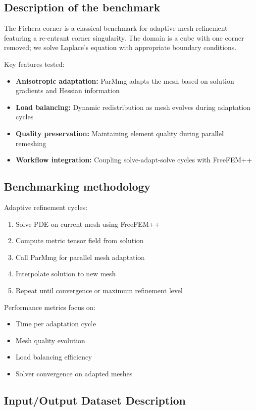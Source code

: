 \subsection{Description of the benchmark}

The Fichera corner is a classical benchmark for adaptive mesh refinement featuring a re‑entrant corner singularity. The domain is a cube with one corner removed; we solve Laplace's equation with appropriate boundary conditions.

Key features tested:
\begin{itemize}
\item \textbf{Anisotropic adaptation:} ParMmg adapts the mesh based on solution gradients and Hessian information
\item \textbf{Load balancing:} Dynamic redistribution as mesh evolves during adaptation cycles
\item \textbf{Quality preservation:} Maintaining element quality during parallel remeshing
\item \textbf{Workflow integration:} Coupling solve-adapt-solve cycles with FreeFEM++
\end{itemize}

\subsection{Benchmarking methodology}

Adaptive refinement cycles:
\begin{enumerate}
\item Solve PDE on current mesh using FreeFEM++
\item Compute metric tensor field from solution
\item Call ParMmg for parallel mesh adaptation
\item Interpolate solution to new mesh
\item Repeat until convergence or maximum refinement level
\end{enumerate}

Performance metrics focus on:
\begin{itemize}
\item Time per adaptation cycle
\item Mesh quality evolution
\item Load balancing efficiency
\item Solver convergence on adapted meshes
\end{itemize}


\subsection{Input/Output Dataset Description}

